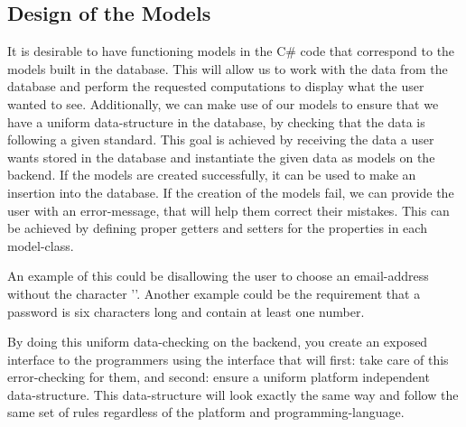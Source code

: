 \subsection{Design of the Models}\label{subsec:designmodels}
It is desirable to have functioning models in the C\# code that correspond to the models built in the database. This will allow us to work with the data from the database and perform the requested computations to display what the user wanted to see. Additionally, we can make use of our models to ensure that we have a uniform data-structure in the database, by checking that the data is following a given standard. This goal is achieved by receiving the data a user wants stored in the database and instantiate the given data as models on the backend. If the models are created successfully, it can be used to make an insertion into the database. If the creation of the models fail, we can provide the user with an error-message, that will help them correct their mistakes. This can be achieved by defining proper getters and setters for the properties in each model-class. 

An example of this could be disallowing the user to choose an email-address without the character '\@'. Another example could be the requirement that a password is six characters long and contain at least one number.

By doing this uniform data-checking on the backend, you create an exposed interface to the programmers using the interface that will first: take care of this error-checking for them, and second: ensure a uniform platform independent data-structure. This data-structure will look exactly the same way and follow the same set of rules regardless of the platform and programming-language. 